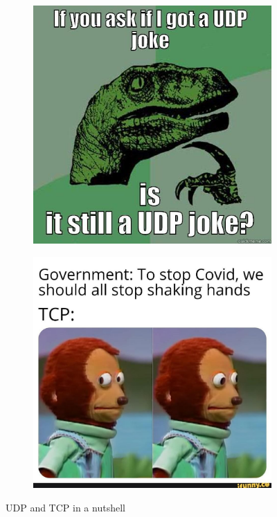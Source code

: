 \documentclass[hidelinks, 12pt, a4paper]{article}
\begin{document}
\begin{figure}[h!]
     \begin{subfigure}[b]{0.5\textwidth}
         \centering
         \includegraphics[height=.28\textheight, width=\textwidth]{assets/meme.jpg}
     \end{subfigure}
     \hfill
     \begin{subfigure}[b]{0.5\textwidth}
         \centering
         \includegraphics[height=.28\textheight, width=\textwidth]{assets/meme2.jpg}
     \end{subfigure}
     \caption{UDP and TCP in a nutshell}
\end{figure}
\end{document}
